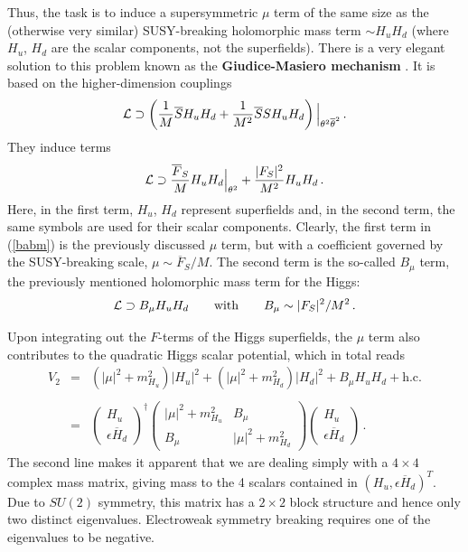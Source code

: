 \documentclass[12pt]{article}
\newcommand{\be}{\begin{equation}}
\newcommand{\ee}{\end{equation}}
\newcommand{\bea}{\begin{eqnarray}}
\newcommand{\eea}{\end{eqnarray}}
\newcommand{\ol}{\overline}
\numberwithin{equation}{section}
\begin{document}
Thus, the task is to induce a supersymmetric $\mu$ term of the same size as the (otherwise very similar) SUSY-breaking holomorphic mass term $\sim H_uH_d$ (where $H_u$, $H_d$ are the scalar components, not the superfields). There is a very elegant solution to this problem known as the {\bf Giudice-Masiero mechanism} \cite{Giudice:1988yz}. It is based on the higher-dimension couplings
\be
{\cal L}\supset \left(\frac{1}{M}\ol{S}H_uH_d+\frac{1}{M^2}\ol{S}S H_u H_d\right)\Big|_{\theta^2\ol{\theta}^2}\,.
\ee
They induce terms
\be
{\cal L}\supset \frac{\ol{F}_S}{M}H_uH_d\Big|_{\theta^2}+\frac{|F_S|^2}{M^2}H_uH_d\,. \label{babm}
\ee
Here, in the first term, $H_u$, $H_d$ represent superfields and, in the second term, the same symbols are used for their scalar components. Clearly, the first term in (\ref{babm}) is the previously discussed $\mu$ term, but with a coefficient governed by the SUSY-breaking scale, $\mu\sim \ol{F}_S/M$. The second term is the so-called $B_\mu$ term, the previously mentioned holomorphic mass term for the Higgs:
\be
{\cal L}\supset B_\mu H_uH_d\qquad \mbox{with}\qquad B_\mu\sim |F_S|^2/M^2\,.
\ee

Upon integrating out the $F$-terms of the Higgs superfields, the $\mu$ term also contributes to the quadratic Higgs scalar potential, which in total reads
\bea
V_2 &=& (|\mu|^2+m_{H_u}^2)|H_u|^2+(|\mu|^2+m_{H_d}^2)|H_d|^2
+ B_\mu H_u H_d+\mbox{h.c.}\nonumber \\ \label{hmm}
\\ \nonumber
&=& \left( \begin{array}{c}H_u \\ \epsilon\ol{H}_d \end{array} \right)^\dagger
\left( \begin{array}{cc} |\mu|^2+m_{H_u}^2 & B_\mu \\ B_\mu &  |\mu|^2+m_{H_d}^2\end{array} \right)
\left( \begin{array}{c}H_u \\ \epsilon\ol{H}_d \end{array} \right)\,.
\eea
The second line makes it apparent that we are dealing simply with a $4\times 4$ complex mass matrix, giving mass to the 4 scalars contained in $(H_u,\epsilon \ol{H}_d)^T$. Due to $SU(2)$ symmetry, this matrix has a $2\times 2$ block structure and hence only two distinct eigenvalues. Electroweak symmetry breaking requires one of the eigenvalues to be negative.
\end{document}
